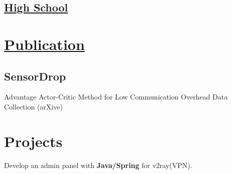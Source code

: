 \documentclass[]{plushcv}
\begin{document}
\begin{minipage}[t]{0.25\textwidth}
\sectionsep
\subsection{\href{https://en.wikipedia.org/wiki/National_Organization_for_Development_of_Exceptional_Talents}{High School}}
\sectionsep

\section{\href{https://scholar.google.com/citations?view_op=view_citation&hl=en&user=PEj2AqMAAAAJ&citation_for_view=PEj2AqMAAAAJ:aqlVkmm33-oC}{Publication}}
\subsection{SensorDrop}
 Advantage Actor-Critic Method for Low Communication Overhead Data Collection (arXive)
 
\section{Projects}
Develop an admin panel with \textbf{Java/Spring} for v2ray(VPN).


\end{minipage} 
\end{document}
